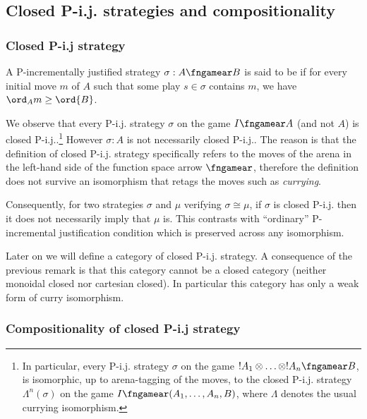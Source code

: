 \subsection{Closed P-i.j. strategies and compositionality}

\subsubsection{Closed P-i.j strategy}

\begin{definition}
\label{def:safe_strategy}
A P-incrementally justified strategy $\sigma : A \fngamear B$ is said to be  if for
every initial move $m$ of $A$ such that some play $s\in\sigma$ contains $m$, we have $\ord_A{m} \geq \ord{B}$. 
\end{definition}
We observe that every P-i.j. strategy $\sigma$ on the game $I \fngamear A$ (and not $A$) is closed P-i.j..\footnote{In particular, every P-i.j. strategy $\sigma$ on the game $!A_1 \otimes \ldots \otimes !A_n \fngamear B$, is isomorphic, up to arena-tagging of the moves, to the closed P-i.j. strategy $\Lambda^n(\sigma)$ on the game $I \fngamear (A_1,\ldots,A_n,B)$, where $\Lambda$ denotes the usual currying isomorphism.}
However $\sigma : A$ is not necessarily closed P-i.j.. The reason is that the definition of closed P-i.j. strategy specifically refers to the moves of  the arena in the left-hand side of the function space arrow $\fngamear$, therefore the definition does not survive an isomorphism that retags the moves such as {\it currying}.

Consequently, for two strategies $\sigma$ and $\mu$ verifying $\sigma \cong \mu$, if $\sigma$ is closed P-i.j. then it does not necessarily imply that $\mu$ is. This contrasts with ``ordinary'' P-incremental justification condition which is preserved across any isomorphism.

Later on we will define a category of closed P-i.j. strategy. A consequence of the previous remark is that this category cannot be a closed category (neither monoidal closed nor cartesian closed).
In particular this category has only a weak form of curry isomorphism.

\subsubsection{Compositionality of closed P-i.j strategy}

